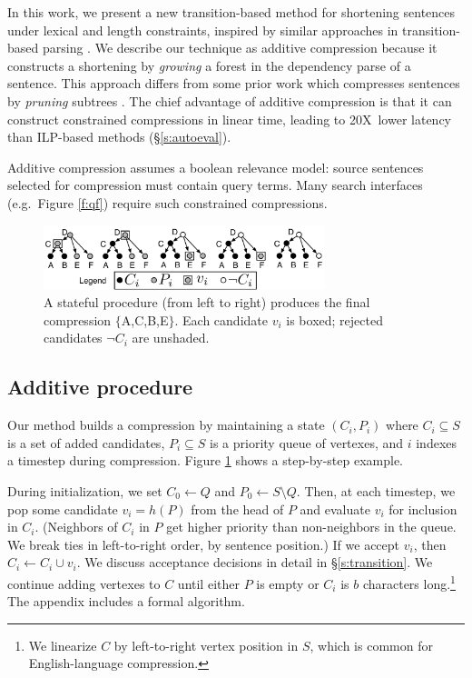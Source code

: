 \documentclass[11pt,a4paper]{article}
\newcommand{\speedup}[0]{20X~}
\begin{document}
In this work, we present a new transition-based method for shortening sentences under lexical and length constraints, inspired by similar approaches in transition-based parsing \cite{nivre2003}. We describe our technique as additive compression because it constructs a shortening by \textit{growing} a forest in the dependency parse of a sentence. This approach differs from some prior work which
compresses sentences by \textit{pruning} subtrees \cite{Knight2000StatisticsBasedS,berg2011jointly,almeida2013fast,Filippova2015FastKS}. The chief advantage of additive compression is that it can construct constrained compressions in linear time, leading to \speedup lower latency than ILP-based methods (\S\ref{s:autoeval}). 

Additive compression assumes a boolean relevance model: source sentences selected for compression must contain query terms. Many search interfaces (e.g.\ Figure \ref{f:qf}) require such constrained compressions.


\begin{figure}[h]
\includegraphics[width=8.2cm]{additive.pdf}
\caption{A stateful procedure (from left to right) produces the final compression $\{$A,C,B,E$\}$. Each candidate $v_i$ is boxed; rejected candidates $\neg C_i$ are unshaded.}
\label{f:walkthru}
\end{figure}

\subsection{Additive procedure}\label{s:formal}

Our method builds a compression by maintaining a state
$(C_i,P_i)$ where $C_i \subseteq S$ is a set of added candidates, $P_i  \subseteq S$ is a priority queue of vertexes, and $i$ indexes a timestep during compression. Figure \ref{f:walkthru} shows a step-by-step example. 

During initialization, we set $C_0 \gets Q$ and $P_0 \gets S \setminus Q$. Then, at each timestep, we pop some candidate $v_i =h(P)$ from the head of $P$ and evaluate $v_i$ for inclusion in $C_i$. (Neighbors of $C_i$ in $P$ get higher priority than non-neighbors in the queue. We break ties in left-to-right order, by sentence position.) If we accept $v_i$, then $C_i \gets C_i \cup v_i$. We discuss acceptance decisions in detail in \S\ref{s:transition}. We continue adding vertexes to $C$ until either $P$ is empty or $C_i$ is $b$ characters long.\footnote{We linearize $C$ by left-to-right vertex position in $S$, which is common for English-language compression.} The appendix includes a formal algorithm. 
\end{document}

